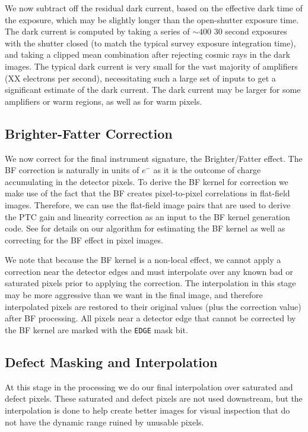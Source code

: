 \documentclass[SE,authoryear,lsstdraft,toc]{lsstdoc}
\newcommand{\etron}{e^{-}}
\begin{document}
We now subtract off the residual dark current, based on the effective dark time of the exposure, which may be slightly longer than the open-shutter exposure time.
The dark current is computed by taking a series of $\sim400$ 30 second exposures with the shutter closed (to match the typical survey exposure integration time), and taking a clipped mean combination after rejecting cosmic rays in the dark images.
The typical dark current is very small for the vast majority of amplifiers (XX electrons per second), necessitating such a large set of inputs to get a significant estimate of the dark current.
The dark current may be larger for some amplifiers or warm regions, as well as for warm pixels.

\subsection{Brighter-Fatter Correction}
\label{sec:bfcorr}

We now correct for the final instrument signature, the Brighter/Fatter effect.
The BF correction is naturally in units of $\etron$ as it is the outcome of charge accumulating in the detector pixels.
To derive the BF kernel for correction we make use of the fact that the BF creates pixel-to-pixel correlations in flat-field images.
Therefore, we can use the flat-field image pairs that are used to derive the PTC gain and linearity correction as an input to the BF kernel generation code.  See \citet{2024PASP..136d5003B} for details on our algorithm for estimating the BF kernel as well as correcting for the BF effect in pixel images.

We note that because the BF kernel is a non-local effect, we cannot apply a correction near the detector edges and must interpolate over any known bad or saturated pixels prior to applying the correction.
The interpolation in this stage may be more aggressive than we want in the final image, and therefore interpolated pixels are restored to their original values (plus the correction value) after BF processing.
All pixels near a detector edge that cannot be corrected by the BF kernel are marked with the \texttt{EDGE} mask bit.

\subsection{Defect Masking and Interpolation}
\label{sec:defectmasking}

At this stage in the processing we do our final interpolation over saturated and defect pixels.
These saturated and defect pixels are not used downstream, but the interpolation is done to help create better images for visual inspection that do not have the dynamic range ruined by unusable pixels.
\end{document}
